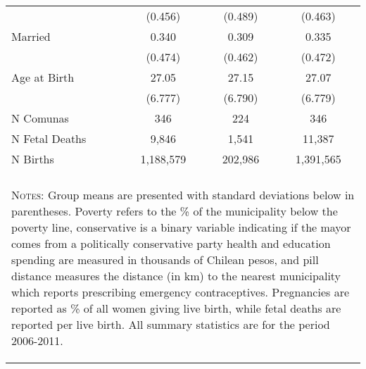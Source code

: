 \begin{table}[htpb!]
\begin{tabular} {@{\extracolsep{5pt}}lp{1cm}ccc}
&&     (0.456)&     (0.489)&     (0.463)\\
Married     &&       0.340&       0.309&       0.335\\
&&     (0.474)&     (0.462)&     (0.472)\\
Age at Birth      &&       27.05&       27.15&       27.07\\
&&     (6.777)&     (6.790)&     (6.779)\\ \midrule
N Comunas && 346 &224& 346 \\
N Fetal Deaths &&9,846&1,541&11,387\\
N Births &&1,188,579&202,986&1,391,565\\
\hline \hline \\[-1.8ex]
\multicolumn{5}{p{13.3cm}}{\begin{footnotesize}\textsc{Notes:}
Group means are presented with standard deviations below in
parentheses.  Poverty refers to the \% of the municipality
below the poverty line, conservative is a binary variable
indicating if the mayor comes from a politically conservative
party
health and education spending are measured in thousands
of Chilean
pesos, and pill distance measures the distance (in km) to the
nearest municipality which reports prescribing emergency
contraceptives.  Pregnancies are reported as \% of all women
giving live birth, while fetal deaths are reported per live
birth.  All summary statistics are for the period 2006-2011.
\end{footnotesize}} \normalsize\end{tabular}\end{table}
